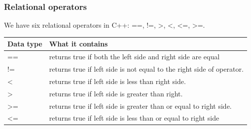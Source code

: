 \documentclass[11pt, a4paper]{article}
\begin{document}
\subsubsection{Relational operators}
We have six relational operators in C++: ==, !=, \textgreater, \textless,  \textless =,
\textgreater =.

\begin{tabular}{ |p{3cm}||p{10cm}| }
    \hline
    \textbf{Data type} & \textbf{What it contains} \\
    \hline
    ==  & returns true if both the left side and right side are equal   \\
    != & returns true if left side is not equal to the right side of operator. \\
    \textless &returns true if left side is less than right side.\\
    \textgreater& returns true if left side is greater than right.  \\
    \textgreater = & returns true if left side is greater than or equal to right side.\\
    \textless = & returns true if left side is less than or equal to right side\\
    \hline
\end{tabular}
\end{document}
